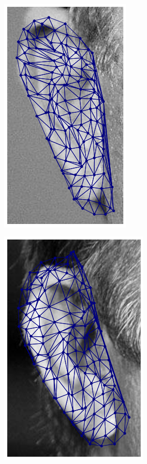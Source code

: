 \begin{figure}[!h]
\begin{subfigure}[b]{0.7\textwidth}
    \end{subfigure}
    \begin{subfigure}[b]{0.7\textwidth}
            \includegraphics[height=1\textwidth]{supports/Fittings/fitting_ear_0031}
    \end{subfigure}
    \begin{subfigure}[b]{0.7\textwidth}
            \includegraphics[height=1\textwidth]{supports/Fittings/fitting_ear_0032}

\end{subfigure}
\end{figure}
